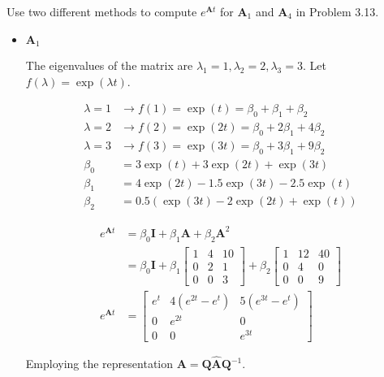 \item [3.22] Use two different methods to compute $e^{\mathbf{A}t}$ for
$\mathbf{A}_1$ and $\mathbf{A}_4$ in Problem 3.13.

\begin{itemize}
 \item $\mathbf{A}_1$

The eigenvalues of the matrix are $\lambda_1 = 1, \lambda_2 = 2, \lambda_3 = 3$.
 Let $f(\lambda) = \exp(\lambda t)$.

 \begin{align*}
  \lambda = 1 & \rightarrow f(1) = \exp(t) = \beta_0 + \beta_1 + \beta_2\\
  \lambda = 2 & \rightarrow f(2) = \exp(2t) = \beta_0 + 2 \beta_1 + 4\beta_2 \\
  \lambda = 3 & \rightarrow f(3) = \exp(3t) = \beta_0 + 3\beta_1 + 9\beta_2 \\
%
  \beta_0 &= 3\exp(t) + 3 \exp(2t) + \exp(3t)\\
  \beta_1 &= 4 \exp(2t) -1.5 \exp(3t) -2.5 \exp(t)\\
  \beta_2 &= 0.5(\exp(3t) -2\exp(2t) + \exp(t))
\end{align*}

\begin{align*}
    e^{\mathbf{A}t} &= \beta_0 \mathbf{I} +  \beta_1 \mathbf{A} + \beta_2 \mathbf{A}^2\\
    &= \beta_0 \mathbf{I} +   \beta_1 \begin{bmatrix}
           1& 4& 10\\
           0 & 2 & 1\\
           0 & 0 &3
          \end{bmatrix}
+
 \beta_2       \begin{bmatrix}
            1 & 12 & 40\\
            0 & 4 & 0\\
            0 & 0 & 9
        \end{bmatrix}\\
         e^{\mathbf{A}t} &=  \begin{bmatrix}
            e^t & 4 (e^{2t} - e^t) & 5 (e^{3t} - e^t) \\
            0 & e^{2t} & 0\\
            0 & 0 & e^{3t}
        \end{bmatrix}
 \end{align*}


 Employing the representation $\mathbf{A} = \mathbf{Q} \hat{\mathbf{A}} \mathbf{Q}^{-1} $.


\end{itemize}

